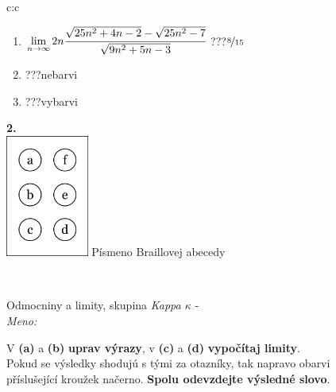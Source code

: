 \documentclass[10pt]{report}
\begin{document}
\begin{tabular}{c:c}
\begin{minipage}[c][104.5mm][t]{0.5\linewidth}
\begin{center}
\begin{minipage}{0.79\linewidth}
\begin{center}
\begin{varwidth}{\linewidth}
\begin{enumerate}
\item $\lim\limits_{n\to\infty}2n\cfrac{\sqrt{25n^2+4n-2}-\sqrt{25n^2-7}}{\sqrt{9n^2+5n-3}}$\quad \dotfill\; ???\;\dotfill \quad $\nicefrac{8}{15}$
\item \quad \dotfill\; ???\;\dotfill \quad nebarvi
\item \quad \dotfill\; ???\;\dotfill \quad vybarvi
\end{enumerate}
\end{varwidth}
\end{center}
\end{minipage}
\begin{minipage}{0.20\linewidth}
\begin{center}
{\Huge\bfseries 2.} \\[2mm]
\includegraphics[height=40mm]{../images/braille.png}
{\small Písmeno Braillovej abecedy}
\end{center}
\end{minipage}
\end{center}
\end{minipage}
\\ \hdashline
\begin{minipage}[c][104.5mm][t]{0.5\linewidth}
\begin{center}
\vspace{7mm}
{\huge Odmocniny a limity, skupina \textit{Kappa $\kappa$} -}\\[5mm]
\textit{Meno:}\phantom{xxxxxxxxxxxxxxxxxxxxxxxxxxxxxxxxxxxxxxxxxxxxxxxxxxxxxxxxxxxxxxxxx}\\[5mm]
\begin{minipage}{0.95\linewidth}
\begin{center}
V \textbf{(a)} a \textbf{(b)} \textbf{uprav výrazy}, v \textbf{(c)} a \textbf{(d)} \textbf{vypočítaj limity}.\\Pokud se výsledky shodujú s tými za otazníky, tak napravo obarvi\\příslušející kroužek načerno. \textbf{Spolu odevzdejte výsledné slovo}.
\end{center}
\end{minipage}
\\[1mm]

\end{center}
\end{minipage}
\end{tabular}
\end{document}
